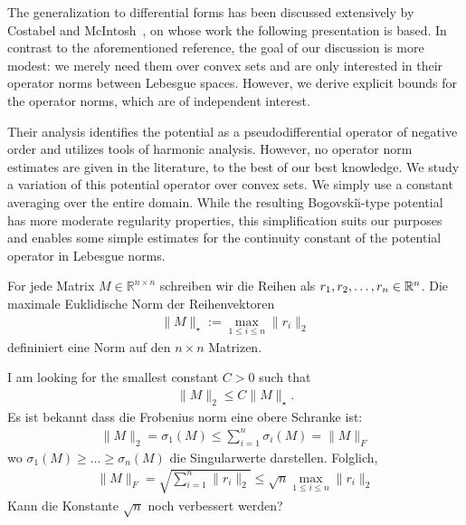 \documentclass[a4paper]{article}
\begin{document}
    The generalization to differential forms has been discussed extensively by Costabel and McIntosh~\cite{costabel2010bogovskiui},
    on whose work the following presentation is based. 
    In contrast to the aforementioned reference, the goal of our discussion is more modest:
    we merely need them over convex sets and are only interested in their operator norms between Lebesgue spaces.
    However, we derive explicit bounds for the operator norms, which are of independent interest. 

    
    Their analysis identifies the potential as a pseudodifferential operator of negative order and utilizes tools of harmonic analysis. However, no operator norm estimates are given in the literature, to the best of our best knowledge.
    We study a variation of this potential operator over convex sets.
    We simply use a constant averaging over the entire domain. 
    While the resulting Bogovski\u{\i}-type potential has more moderate regularity properties, 
    this simplification suits our purposes and enables some simple estimates for the continuity constant of the potential operator in Lebesgue norms. 


For jede Matrix $M \in \mathbb R^{n \times n}$ schreiben wir die Reihen als $r_1, r_2, \dots, r_n \in {\mathbb R}^{n}$.
Die maximale Euklidische Norm der Reihenvektoren
\begin{align*}
    \| M \|_{\star} := \max\limits_{1 \leq i \leq n} \| r_i \|_{2}
\end{align*}
defininiert eine Norm auf den $n \times n$ Matrizen.

I am looking for the smallest constant $C > 0$ such that 
\begin{align*}
    \| M \|_{2} \leq C \| M \|_{\star}.
\end{align*}
Es ist bekannt dass die Frobenius norm eine obere Schranke ist:
\begin{align*}
    \| M \|_{2} = \sigma_{1}(M) \leq \sum_{i=1}^{n} \sigma_{i}(M) = \| M \|_{F}
\end{align*}
wo $\sigma_{1}(M) \geq \dots \geq \sigma_{n}(M)$ die Singularwerte darstellen. Folglich,
\begin{align*}
    \| M \|_{F} = \sqrt{\sum_{i=1}^{n} \| r_i \|_{2} } \leq \sqrt{n} \max\limits_{1 \leq i \leq n} \| r_i \|_{2}
\end{align*}
Kann die Konstante $\sqrt{n}$ noch verbessert werden?
\end{document}
